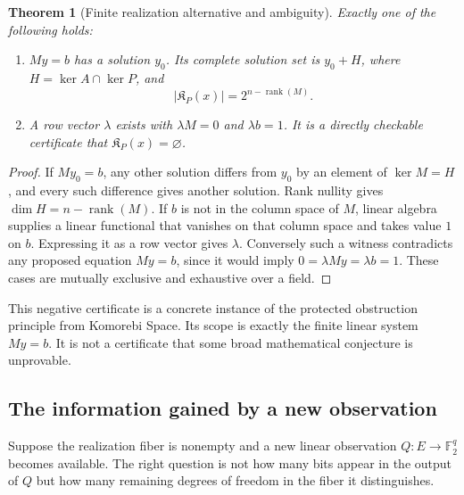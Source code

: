 \documentclass[11pt,oneside]{article}
\theoremstyle{komorebiplain}
\newtheorem{theorem}{Theorem}[section]
\theoremstyle{komorebidefinition}
\theoremstyle{komorebiremark}
\begin{document}
\begin{theorem}[Finite realization alternative and ambiguity]
\label{res:23:4}
Exactly one of the following holds:
\begin{enumerate}[label=\textup{(\roman*)}]
\item $My=b$ has a solution $y_0$. Its complete solution set is $y_0+H$, where $H=\ker A\cap\ker P$, and
\[
|\mathfrak K_P(x)|=2^{n-\operatorname{rank}(M)}.
\]
\item A row vector $\lambda$ exists with $\lambda M=0$ and $\lambda b=1$. It is a directly checkable certificate that $\mathfrak K_P(x)=\varnothing$.
\end{enumerate}
\end{theorem}
\begin{proof}
If $My_0=b$, any other solution differs from $y_0$ by an element of $\ker M=H$, and every such difference gives another solution. Rank nullity gives $\dim H=n-\operatorname{rank}(M)$. If $b$ is not in the column space of $M$, linear algebra supplies a linear functional that vanishes on that column space and takes value $1$ on $b$. Expressing it as a row vector gives $\lambda$. Conversely such a witness contradicts any proposed equation $My=b$, since it would imply $0=\lambda My=\lambda b=1$. These cases are mutually exclusive and exhaustive over a field.
\end{proof}

This negative certificate is a concrete instance of the protected obstruction principle from Komorebi Space. Its scope is exactly the finite linear system $My=b$. It is not a certificate that some broad mathematical conjecture is unprovable.

\subsection{The information gained by a new observation}

Suppose the realization fiber is nonempty and a new linear observation $Q:E\to\mathbb F_2^q$ becomes available. The right question is not how many bits appear in the output of $Q$ but how many remaining degrees of freedom in the fiber it distinguishes.
\end{document}
